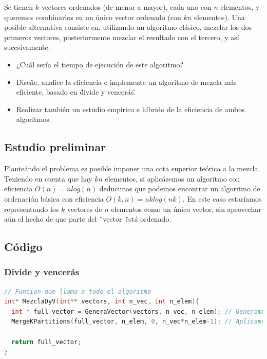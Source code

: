 
Se tienen $k$ vectores ordenados (de menor a mayor), cada uno con $n$ elementos, y queremos
combinarlos en un \'unico vector ordenado (con $kn$ elementos). Una posible alternativa consiste en, utilizando un algoritmo cl\'asico, mezclar los dos primeros vectores, posteriormente mezclar el resultado con el tercero, y as\'i sucesivamente.

\begin{itemize}
    \item ¿Cu\'al ser\'ia el tiempo de ejecuci\'on de este algoritmo?
	\item Diseñe, analice la eficiencia e implemente un algoritmo de mezcla m\'as eficiente, 		  basado en \"divide y vencer\'as\".
	\item Realizar tambi\'en un estudio emp\'irico e h\'ibrido de la eficiencia de ambos 				  algoritmos.
\end{itemize}

\subsection{Estudio preliminar}
Plante\'ando el problema es posible imponer una cota superior te\'orica a la mezcla. Teniendo en cuenta que hay $kn$ elementos, si aplic\'asemos un algoritmo con eficiencia  $O(n)=nlog(n)$ deducimos que podemos encontrar un algoritmo de ordenaci\'on b\'asica con eficiencia $O(k,n)=nklog(nk)$. En este caso estar\'iamos representando los $k$ vectores de $n$ elementos como un \'unico vector, sin aprovechar a\'un el hecho de que parte del \"\ vector\ \" est\'a ordenado.

\subsection{C\'odigo}

\subsubsection{Divide y vencer\'as}

\begin{lstlisting}[language=c++]
// Funcion que llama a todo el algoritmo
int* MezclaDyV(int** vectors, int n_vec, int n_elem){
  int * full_vector = GeneraVector(vectors, n_vec, n_elem); // Generamos el vector a devolver
  MergeKPartitions(full_vector, n_elem, 0, n_vec*n_elem-1); // Aplicamos la particion y mezcla

  return full_vector;
}
\end{lstlisting}

